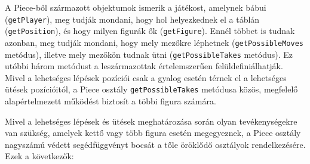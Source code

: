 \documentclass[12pt, twoside]{report}
\begin{document}
A Piece-ből származott objektumok ismerik a játékost, amelynek bábui ({\tt getPlayer}), meg tudják mondani, hogy hol helyezkednek el a táblán ({\tt getPosition}), és hogy milyen figurák ők ({\tt getFigure}). Ennél többet is tudnak azonban, meg tudják mondani, hogy mely mezőkre léphetnek ({\tt getPossibleMoves} metódus), illetve mely mezőkön tudnak ütni ({\tt getPossibleTakes} metódus). Ez utóbbi három metódust a leszármazottak értelemszerűen felüldefiniálhatják. Mivel a lehetséges lépések pozíciói csak a gyalog esetén térnek el a lehetséges ütések pozícióitól, a Piece osztály {\tt getPossibleTakes} metódusa közös, megfelelő alapértelmezett működést biztosít a többi figura számára.

Mivel a lehetséges lépések és ütések meghatározása során olyan tevékenységekre van szükség, amelyek kettő vagy több figura esetén megegyeznek, a Piece osztály nagyszámú védett segédfüggvényt bocsát a tőle öröklődő osztályok rendelkezésére. Ezek a következők:
\end{document}
